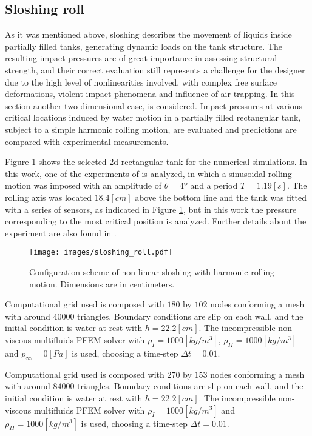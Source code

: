 \subsection{Sloshing roll}

As it was mentioned above, sloshing describes the movement of liquids inside partially filled tanks, generating dynamic loads on the tank structure. The resulting impact pressures are of great importance in assessing structural strength, and their correct evaluation still represents a challenge for the designer due to the high level of nonlinearities involved, with complex free surface deformations, violent
impact phenomena and influence of air trapping. In this section another two-dimensional case, is considered. Impact pressures at various critical locations induced by water motion in a partially filled rectangular tank, subject to a simple harmonic rolling motion, are evaluated and predictions are compared with experimental measurements\cite{Brizzolara09}\cite{Delorme09}.

Figure \ref{fg:roll-config} shows the selected 2d rectangular tank for the numerical simulations. In this work, one of the experiments of \cite{Brizzolara09} is analyzed, in which a sinusoidal rolling motion was imposed with an amplitude of $\theta=4º$ and a period $T=1.19[s]$. The rolling axis was located $18.4[cm]$ above the bottom line and the tank was fitted with a series of sensors, as indicated in Figure \ref{fg:roll-config}, but in this work the pressure corresponding to the most critical position is analyzed. Further details about the experiment are also found in \cite{Brizzolara11}.

\begin{figure}[H]
  \begin{center}
      \texttt{[image: images/sloshing\_roll.pdf]}
  \end{center}
  \caption{\label{fg:roll-config} Configuration scheme of non-linear sloshing with harmonic rolling motion. Dimensions are in centimeters.}
\end{figure}

Computational grid used is composed with $180$ by $102$ nodes conforming a mesh with around $40000$ triangles. Boundary conditions are slip on each wall, and the initial condition is water at rest with $h=22.2[cm]$. The incompressible non-viscous multifluids PFEM solver with $\rho_{I}=1000[kg/m^3]$, $\rho_{II}=1000[kg/m^3]$ and $p_{\infty}=0[Pa]$ is used, choosing a time-step $\Delta t=0.01$.

Computational grid used is composed with $270$ by $153$ nodes conforming a mesh with around $84000$ triangles. Boundary conditions are slip on each wall, and the initial condition is water at rest with $h=22.2[cm]$. The incompressible non-viscous multifluids PFEM solver with $\rho_{I}=1000[kg/m^3]$ and $\rho_{II}=1000[kg/m^3]$ is used, choosing a time-step $\Delta t=0.01$.